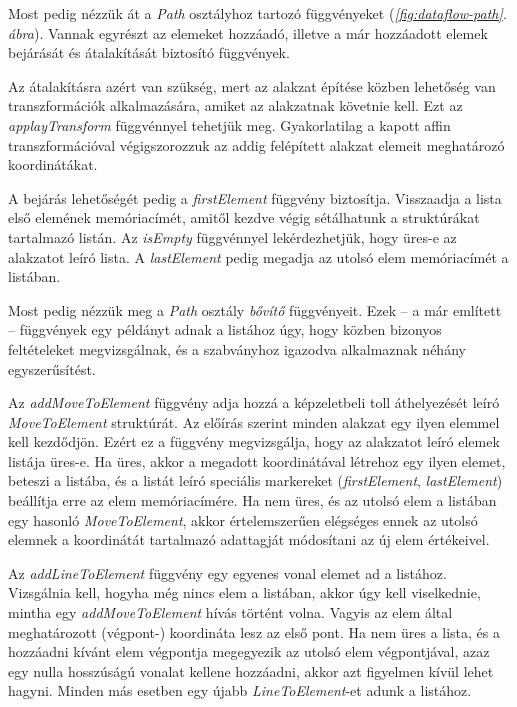 \documentclass[12pt]{report}
\theoremstyle{definition}
\newcommand{\func}[1]{{\textsl{#1}}}
\begin{document}
Most pedig nézzük át a \func{Path} osztályhoz tartozó függvényeket
(\emph{\ref{fig:dataflow-path}. ábra}). Vannak egyrészt az elemeket
hozzáadó, illetve a már hozzáadott elemek bejárását és átalakítását biztosító
függvények.

Az átalakításra azért van szükség, mert az alakzat építése közben lehetőség van
transzformációk alkalmazására, amiket az alakzatnak követnie kell. Ezt
az \func{applayTransform} függvénnyel tehetjük meg. Gyakorlatilag a kapott affin
transzformációval végigszorozzuk az addig felépített alakzat elemeit
meghatározó koordinátákat.

A bejárás lehetőségét pedig a \func{firstElement} függvény biztosítja.
Visszaadja a lista első elemének memóriacímét, amitől kezdve végig sétálhatunk
a struktúrákat tartalmazó listán. Az \func{isEmpty} függvénnyel
lekérdezhetjük, hogy üres-e az alakzatot leíró lista. A \func{lastElement}
pedig megadja az utolsó elem memóriacímét a listában.

Most pedig nézzük meg a \func{Path} osztály \emph{bővítő} függvényeit. Ezek --
a már említett -- függvények egy példányt adnak a listához úgy, hogy közben
bizonyos feltételeket megvizsgálnak, és a szabványhoz igazodva alkalmaznak
néhány egyszerűsítést.

Az \func{addMoveToElement} függvény adja hozzá a képzeletbeli toll áthelyezését
leíró \func{MoveToElement} struktúrát. Az előírás szerint minden alakzat egy
ilyen elemmel kell kezdődjön. Ezért ez a függvény megvizsgálja, hogy az
alakzatot leíró elemek listája üres-e. Ha üres, akkor a megadott koordinátával
létrehoz egy ilyen elemet, beteszi a listába, és a listát leíró speciális
markereket (\func{firstElement}, \func{lastElement}) beállítja erre az elem
memóriacímére. Ha nem üres, és az utolsó elem a listában egy hasonló
\func{MoveToElement}, akkor értelemszerűen elégséges ennek az utolsó elemnek a
koordinátát tartalmazó adattagját módosítani az új elem értékeivel.

Az \func{addLineToElement} függvény egy egyenes vonal elemet ad a listához.
Vizsgálnia kell, hogyha még nincs elem a listában, akkor úgy kell viselkednie,
mintha egy \func{addMoveToElement} hívás történt volna. Vagyis az elem által
meghatározott (végpont-) koordináta lesz az első pont. Ha nem üres a lista, és a
hozzáadni kívánt elem végpontja megegyezik az utolsó elem végpontjával, azaz
egy nulla hosszúságú vonalat kellene hozzáadni, akkor azt figyelmen kívül lehet
hagyni. Minden más esetben egy újabb \func{LineToElement}-et adunk a listához.
\end{document}
